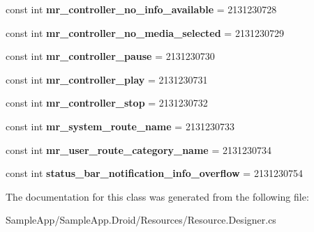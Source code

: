 \begin{DoxyCompactItemize}
\mbox{\label{class_sample_app_1_1_droid_1_1_resource_1_1_string_a5a0c8959ed970eed90fc1634713fb0d9}} 
const int {\bfseries mr\+\_\+controller\+\_\+no\+\_\+info\+\_\+available} = 2131230728
\item 
\mbox{\label{class_sample_app_1_1_droid_1_1_resource_1_1_string_a170f33ee8b25e6d5f340dd78d1ce398d}} 
const int {\bfseries mr\+\_\+controller\+\_\+no\+\_\+media\+\_\+selected} = 2131230729
\item 
\mbox{\label{class_sample_app_1_1_droid_1_1_resource_1_1_string_a7af8913078a4aaa9c68a9fe322d00d3d}} 
const int {\bfseries mr\+\_\+controller\+\_\+pause} = 2131230730
\item 
\mbox{\label{class_sample_app_1_1_droid_1_1_resource_1_1_string_a4a9ec10b0fd414789ecea3d710cd762b}} 
const int {\bfseries mr\+\_\+controller\+\_\+play} = 2131230731
\item 
\mbox{\label{class_sample_app_1_1_droid_1_1_resource_1_1_string_a60a9f410ef181ffae5ffb62d813a121f}} 
const int {\bfseries mr\+\_\+controller\+\_\+stop} = 2131230732
\item 
\mbox{\label{class_sample_app_1_1_droid_1_1_resource_1_1_string_abb9ec35e968de33ce5aa2d5ee9dfdb28}} 
const int {\bfseries mr\+\_\+system\+\_\+route\+\_\+name} = 2131230733
\item 
\mbox{\label{class_sample_app_1_1_droid_1_1_resource_1_1_string_ad9d606a0e3b06aa241fe5403c40623d6}} 
const int {\bfseries mr\+\_\+user\+\_\+route\+\_\+category\+\_\+name} = 2131230734
\item 
\mbox{\label{class_sample_app_1_1_droid_1_1_resource_1_1_string_aa528d375f5646a15dedd5786838d41dc}} 
const int {\bfseries status\+\_\+bar\+\_\+notification\+\_\+info\+\_\+overflow} = 2131230754
\end{DoxyCompactItemize}


The documentation for this class was generated from the following file\+:\begin{DoxyCompactItemize}
\item 
Sample\+App/\+Sample\+App.\+Droid/\+Resources/Resource.\+Designer.\+cs\end{DoxyCompactItemize}
